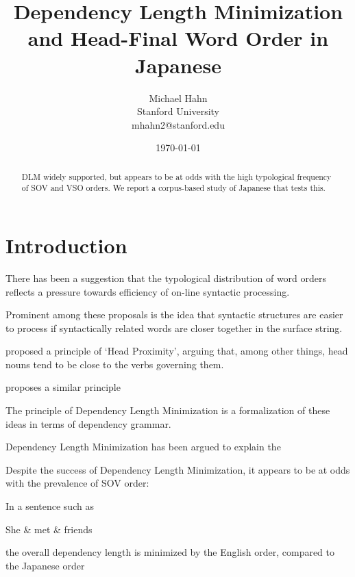 \documentclass[11pt,a4paper]{article}
\title{Dependency Length Minimization and Head-Final Word Order in Japanese}
\author{Michael Hahn \\ Stanford University \\ mhahn2@stanford.edu}
\date{\today}
\begin{document}
\maketitle
\begin{abstract}
DLM widely supported, but appears to be at odds with the high typological frequency of SOV and VSO orders.
We report a corpus-based study of Japanese that tests this.
\end{abstract}

\section{Introduction}

There has been a suggestion that the typological distribution of word orders reflects a pressure towards efficiency of on-line syntactic processing.

Prominent among these proposals is the idea that syntactic structures are easier to process if syntactically related words are closer together in the surface string.

\cite{rijkhoff-word-1986} proposed a principle of `Head Proximity', arguing that, among other things, head nouns tend to be close to the verbs governing them.

\cite{hawkins2014crosslinguistic} proposes a similar principle 

The principle of Dependency Length Minimization \cite{temperley2018minimizing} is a formalization of these ideas in terms of dependency grammar.

Dependency Length Minimization has been argued to explain the 

Despite the success of Dependency Length Minimization, it appears to be at odds with the prevalence of SOV order:

In a sentence such as

\begin{centering}
\begin{dependency}[theme = simple]
   \begin{deptext}[column sep=1em]
          She \& met \& friends  \\
   \end{deptext}
\end{dependency}
\end{centering}

the overall dependency length is minimized by the English order, compared to the Japanese order
\end{document}
